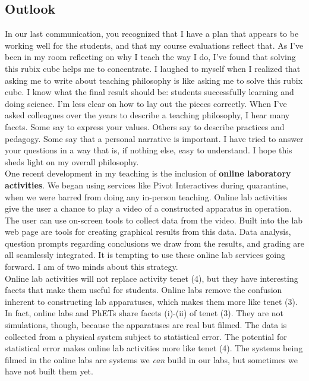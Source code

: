 \documentclass[../../../main.tex]{subfiles}
\begin{document}
\subsection{Outlook}

In our last communication, you recognized that I have a plan that appears to be working well for the students, and that my course evaluations reflect that.  As I've been in my room reflecting on why I teach the way I do, I've found that solving this rubix cube helps me to concentrate.  I laughed to myself when I realized that asking me to write about teaching philosophy is like asking me to solve this rubix cube.  I know what the final result should be: students successfully learning and doing science.  I'm less clear on how to lay out the pieces correctly.  When I've asked colleagues over the years to describe a teaching philosophy, I hear many facets.  Some say to express your values.  Others say to describe practices and pedagogy.  Some say that a personal narrative is important.  I have tried to answer your questions in a way that is, if nothing else, easy to understand.  I hope this sheds light on my overall philosophy.
\\
\vspace{0.15cm}
One recent development in my teaching is the inclusion of \textbf{online laboratory activities}.  We began using services like Pivot Interactives during quarantine, when we were barred from doing any in-person teaching.  Online lab activities give the user a chance to play a video of a constructed apparatus in operation.  The user can use on-screen tools to collect data from the video.  Built into the lab web page are tools for creating graphical results from this data.  Data analysis, question prompts regarding conclusions we draw from the results, and grading are all seamlessly integrated.  It is tempting to use these online lab services going forward.  I am of two minds about this strategy.
\\
\vspace{0.15cm}
Online lab activities will not replace activity tenet (4), but they have interesting facets that make them useful for students.  Online labs remove the confusion inherent to constructing lab apparatuses, which makes them more like tenet (3).  In fact, online labs and PhETs share facets (i)-(ii) of tenet (3).  They are not simulations, though, because the apparatuses are real but filmed.  The data is collected from a physical system subject to statistical error.  The potential for statistical error makes online lab activities more like tenet (4).  The systems being filmed in the online labs are systems we \textit{can} build in our labs, but sometimes we have not built them yet.
\end{document}
